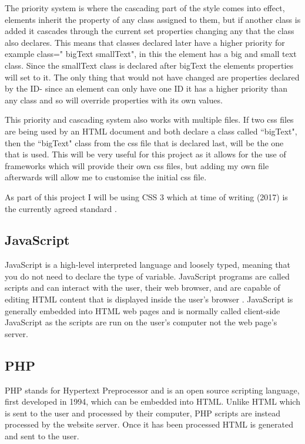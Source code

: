 \documentclass[11pt]{report}
\begin{document}
The priority system \cite{_cascading_????-1} is where the cascading part of the style comes into effect, elements inherit the property of any class assigned to them, but if another class is added it cascades through the current set properties changing any that the class also declares. This means that classes declared later have a higher priority for example class=" bigText smallText", in this the element has a big and small text class. Since the smallText class is declared after bigText the elements properties will set to it. The only thing that would not have changed are properties declared by the ID- since an element can only have one ID it has a higher priority than any class and so will override properties with its own values.  

This priority and cascading system also works with multiple files. If two css files are being used by an HTML document and both declare a class called ``bigText", then the ``bigText" class from the css file that is declared last, will be the one that is used. This will be very useful for this project as it allows for the use of frameworks which will provide their own css files, but adding my own file afterwards will allow me to customise the initial css file.

As part of this project I will be using CSS 3 which at time of writing (2017) is the currently agreed standard \cite{_css_????-1}.


\subsection{JavaScript}

JavaScript is a high-level interpreted language and loosely typed, meaning that you do not need to declare the type of variable. JavaScript programs are called scripts and can interact with the user, their web browser, and are capable of editing HTML content that is displayed inside the user's browser \cite{flanagan_javascript:_2006}. JavaScript is generally embedded into HTML web pages and is normally called client-side JavaScript as the scripts are run on the user's computer not the web page's server.



\subsection{PHP}
\label{sec:php}

PHP stands for Hypertext Preprocessor and is an open source scripting language, first developed in 1994, \cite{_php:_????-1} which can be embedded into HTML. Unlike HTML which is sent to the user and processed by their computer, PHP scripts are instead processed by the website server. Once it has been processed HTML is generated and sent to the user. 
\end{document}
